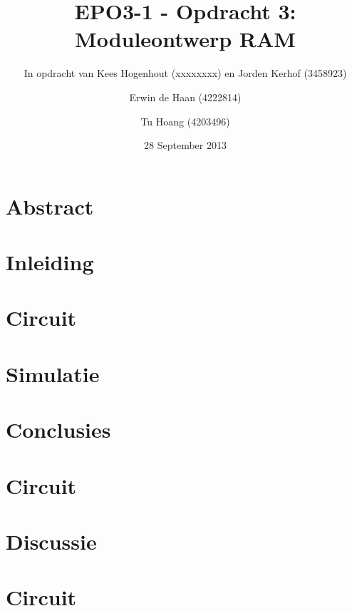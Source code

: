 \documentclass{scrartcl}  %
\author{Erwin {de Haan} (4222814) \and {Tu Hoang} (4203496)}
\title{EPO3-1 - Opdracht 3: Moduleontwerp RAM}
\subtitle{In opdracht van Kees Hogenhout (xxxxxxxx) en Jorden Kerhof (3458923)}
\date{28 September 2013}
\begin{document}
\maketitle
{}
\section*{Abstract}
\newpage
\setlength{\cftbeforetoctitleskip}{-3em}
\tableofcontents

\section{Inleiding}

\newpage
{}

\section{Circuit}

\section{Simulatie}

\section{Conclusies}

\section{Circuit}

\section{Discussie}

\section{Circuit}

\printbibliography
\end{document}
